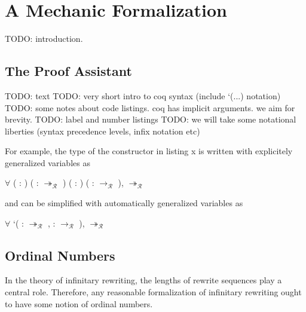 \chapter{A Mechanic Formalization}\label{chap:implementation}

TODO: introduction.


\section{The \Coq Proof Assistant}

TODO: text
TODO: very short intro to coq syntax (include `(...) notation)
TODO: some notes about code listings. coq has implicit arguments. we aim for
brevity.
TODO: label and number listings
TODO: we will take some notational liberties (syntax precedence levels, infix
notation etc)

For example, the type of the  constructor in listing x
is written with explicitely generalized variables as
\begin{singlespace}
\begin{coqdoccode}
\coqdocnoindent
\ensuremath{\forall} (  :
) (\coqdocvar{$\rho$}
:  $\twoheadrightarrow_\mathcal{R}$ )
( : )
(\coqdocvar{$\pi$} : 
$\rightarrow_\mathcal{R}$ ),
 $\twoheadrightarrow_\mathcal{R}$
\coqdoceol
\end{coqdoccode}
\end{singlespace}
and can be simplified with automatically generalized variables as
\begin{singlespace}
\begin{coqdoccode}
\coqdocnoindent
\ensuremath{\forall} `(\coqdocvar{$\rho$} : 
$\twoheadrightarrow_\mathcal{R}$ ,
\coqdocvar{$\pi$} :  $\rightarrow_\mathcal{R}$ ),
 $\twoheadrightarrow_\mathcal{R}$
\coqdoceol
\end{coqdoccode}
\end{singlespace}


\section{Ordinal Numbers}

In the theory of infinitary rewriting, the lengths of rewrite sequences play
a central role. Therefore, any reasonable formalization of infinitary
rewriting ought to have some notion of ordinal numbers.

